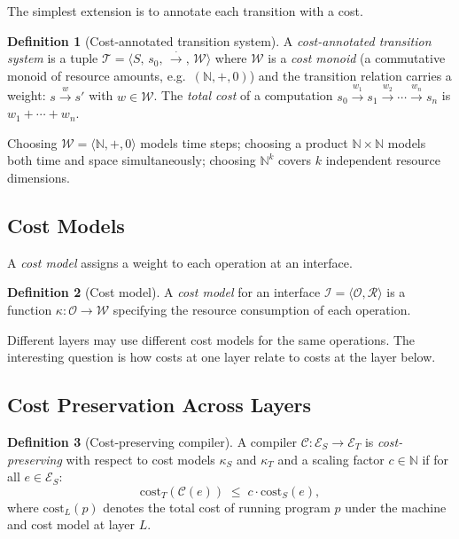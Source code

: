 \documentclass[11pt, a4paper]{article}
\theoremstyle{definition}
\newtheorem{definition}{Definition}[section]
\theoremstyle{plain}
\theoremstyle{remark}
\begin{document}
The simplest extension is to annotate each transition with a cost.

\begin{definition}[Cost-annotated transition system]
  A \emph{cost-annotated transition system} is a tuple
  $\mathcal{T} = \langle S,\, s_0,\, \xrightarrow{\cdot},\, \mathcal{W}\rangle$
  where $\mathcal{W}$ is a \emph{cost monoid} (a commutative monoid of
  resource amounts, e.g.\ $(\mathbb{N}, +, 0)$) and the transition relation
  carries a weight: $s \xrightarrow{w} s'$ with $w \in \mathcal{W}$.
  The \emph{total cost} of a computation $s_0 \xrightarrow{w_1} s_1
  \xrightarrow{w_2} \cdots \xrightarrow{w_n} s_n$ is $w_1 + \cdots + w_n$.
\end{definition}

Choosing $\mathcal{W} = \langle\mathbb{N}, +, 0\rangle$ models time steps; choosing a
product $\mathbb{N} \times \mathbb{N}$ models both time and space
simultaneously; choosing $\mathbb{N}^k$ covers $k$ independent resource
dimensions.

\subsection{Cost Models}

A \emph{cost model} assigns a weight to each operation at an interface.

\begin{definition}[Cost model]
  A \emph{cost model} for an interface $\mathcal{I} = \langle\mathcal{O},
  \mathcal{R}\rangle$ is a function $\kappa : \mathcal{O} \to \mathcal{W}$
  specifying the resource consumption of each operation.
\end{definition}

Different layers may use different cost models for the same operations. The
interesting question is how costs at one layer relate to costs at the layer
below.

\subsection{Cost Preservation Across Layers}

\begin{definition}[Cost-preserving compiler]
  A compiler $\mathcal{C} : \mathcal{E}_S \to \mathcal{E}_T$ is
  \emph{cost-preserving} with respect to cost models $\kappa_S$ and
  $\kappa_T$ and a scaling factor $c \in \mathbb{N}$ if for all
  $e \in \mathcal{E}_S$:
  \[
    \mathrm{cost}_T(\mathcal{C}(e)) \;\leq\; c \cdot \mathrm{cost}_S(e),
  \]
  where $\mathrm{cost}_L(p)$ denotes the total cost of running program $p$
  under the machine and cost model at layer $L$.
\end{definition}
\end{document}
